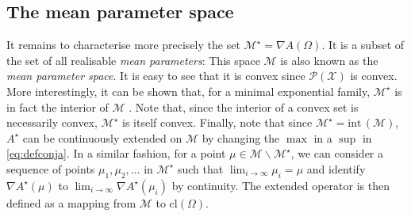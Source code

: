 \subsection{The mean parameter space}
It remains to characterise more precisely the set $\mathcal M^{\star}=\nabla A(\Omega)$. It is a subset of the set of all realisable \emph{mean parameters}:
%
%
This space $\mathcal M$ is also known as the \emph{mean parameter space}. It is easy to see that it is convex since $\mathcal P(\mathcal X)$ is convex. More interestingly, it can be shown that, for a minimal exponential family, $\mathcal M^{\star}$ is in fact the interior of $\mathcal M$ \citep[theorem 3.3]{wainwright08}. Note that, since the interior of a convex set is necessarily convex, $\mathcal M^{\star}$ is itself convex. Finally, note that since $\mathcal M^{\star}=\mathrm{int}\,(\mathcal M)$, $A^{\star}$ can be continuously extended on $\mathcal M$ by changing the $\max$ in a $\sup$ in \eqref{eq:defconja}. In a similar fashion, for a point $\mu\in\mathcal M\backslash \mathcal M^{\star}$, we can consider a sequence of points $\mu_{1},\mu_{2},\dots$ in $\mathcal M^{\star}$ such that $\lim_{i\to\infty}\mu_{i}=\mu$ and identify $\nabla A^{\star}(\mu)$ to $\lim_{i\to\infty}\nabla A^{\star}(\mu_{i})$ by continuity. The extended operator is then defined as a mapping from $\mathcal M$ to $\mathrm{cl}(\Omega)$.

%
